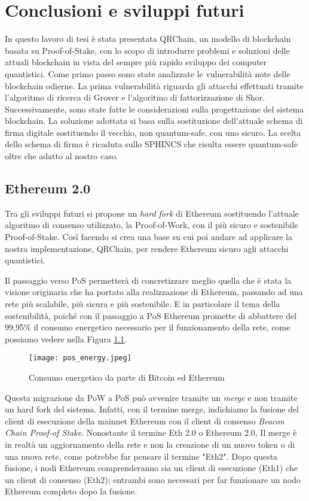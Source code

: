 \chapter{Conclusioni e sviluppi futuri}
In questo lavoro di tesi è stata presentata QRChain, un modello di blockchain basata su Proof-of-Stake, con lo scopo di introdurre problemi e soluzioni delle attuali blockchain in vista del sempre più rapido sviluppo dei computer quantistici. Come primo passo sono state analizzate le vulnerabilità note delle blockchain odierne. La prima vulnerabilità riguarda gli attacchi effettuati tramite l'algoritmo di ricerca di Grover e l'algoritmo di fattorizzazione di Shor. Successivamente, sono state fatte le considerazioni sulla progettazione del sistema blockchain. La soluzione adottata si basa sulla sostituzione dell'attuale schema di firma digitale sostituendo il vecchio, non quantum-safe, con uno sicuro. La scelta dello schema di firma è ricaduta sullo SPHINCS che risulta essere quantum-safe oltre che adatto al nostro caso.

\section{Ethereum 2.0}
Tra gli sviluppi futuri si propone un \textit{hard fork} di Ethereum sostituendo l'attuale algoritmo di consenso utilizzato, la Proof-of-Work, con il più sicuro e sostenibile Proof-of-Stake. Così facendo si crea una base su cui poi andare ad applicare la nostra implementazione, QRChain, per rendere Ethereum sicuro agli attacchi quantistici.

Il passaggio verso PoS permetterà di concretizzare meglio quella che è stata la visione originaria che ha portato alla realizzazione di Ethereum, passando ad una rete più scalabile, più sicura e più sostenibile. E in particolare il tema della sostenibilità, poiché con il passaggio a PoS Ethereum promette di abbattere del 99,95\% il consumo energetico necessario per il funzionamento della rete, come possiamo vedere nella Figura \ref{fig:pos_energy}.

\begin{figure}[h]
  \centering
  \texttt{[image: pos\_energy.jpeg]}
  \caption{Consumo energetico da parte di Bitcoin ed Ethereum}
  \label{fig:pos_energy}
\end{figure}

Questa migrazione da PoW a PoS può avvenire tramite un \textit{merge} e non tramite un hard fork del sistema. Infatti, con il termine merge, indichiamo la fusione del client di esecuzione della mainnet Ethereum con il client di consenso \textit{Beacon Chain Proof-of Stake}. Nonostante il termine Eth 2.0 o Ethereum 2.0, Il merge è in realtà un aggiornamento della rete e non la creazione di un nuovo token o di una nuova rete, come potrebbe far pensare il termine "Eth2". Dopo questa fusione, i nodi Ethereum comprenderanno sia un client di esecuzione (Eth1) che un client di consenso (Eth2); entrambi sono necessari per far funzionare un nodo Ethereum completo dopo la fusione.

